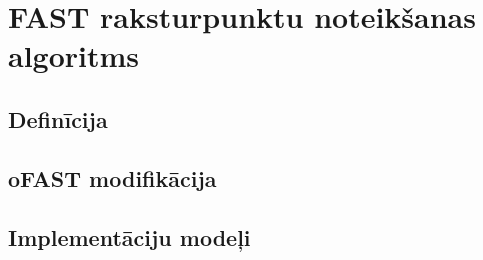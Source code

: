\section{FAST raksturpunktu noteikšanas algoritms} \label{sec:fast}
\subsection{Definīcija} \label{sec:fast-def}
\TODO

\subsection{oFAST modifikācija} \label{sec:ofast}
\TODO

\subsection{Implementāciju modeļi} \label{sec:fast-impl}



